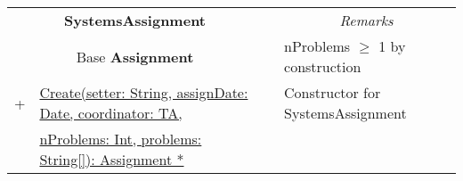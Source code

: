 \documentclass{article}
\begin{document}
\begin{enumerate}
\begin{center}
\begin{scriptsize}
\begin{tabular}{|lllll|l|p{7cm}|} \cline{1-5} \cline{7-7}
\multicolumn{5}{|c|}{\bf \textsf{SystemsAssignment}} 	& & \multicolumn{1}{|c|}{\em Remarks}\\ \cline{1-5} \cline{7-7}
\multicolumn{5}{|c|}{Base {\bf \textsf{Assignment}}} 		& & \textsf{nProblems} $\geq$ 1 by construction \\ \cline{1-5} \cline{7-7}
 + & \multicolumn{4}{l|}{\underline{Create(setter: String, assignDate: Date, coordinator: TA,}} & & Constructor for SystemsAssignment \\ 
   & \multicolumn{4}{l|}{\quad \quad \underline{nProblems: Int, problems: String[]): Assignment *}} & &  \\
 \cline{1-5} \cline{7-7}
\end{tabular}
\end{scriptsize}
\end{center}


\end{enumerate}
\end{document}
